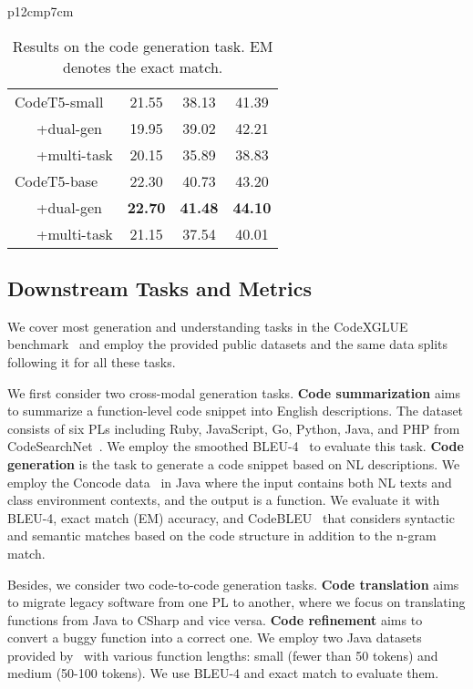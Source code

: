 \documentclass[11pt]{article}
\begin{document}
\begin{table*} [t]
\begin{center}
{\begin{tabular}{p{12cm}p{7cm}}
\begin{minipage}{0.48\textwidth}
{\begin{tabular}{lc c c}
CodeT5-small &21.55	&38.13	&41.39 \\
~~~+dual-gen	&19.95	&39.02	&42.21 \\
~~~+multi-task	& 20.15 &35.89 &38.83 \\
\cdashline{1-4}

CodeT5-base &22.30 &40.73 &43.20 \\
~~~+dual-gen	& \textbf{22.70} &	\textbf{41.48}&	\textbf{44.10}\\
~~~+multi-task	& 21.15 & 37.54 & 40.01 \\

\bottomrule
\end{tabular}
}
\captionsetup{type=table}
\vspace{-0.5em}  
\caption{Results on the code generation task.
EM denotes the exact match.
}
\label{table:concode}

\end{minipage}
\end{tabular}
}
\end{center}
\vspace{-2em}
\end{table*}

 
\subsection{Downstream Tasks and  Metrics}
We cover most generation and understanding tasks in the CodeXGLUE benchmark~\cite{DBLP:journals/corr/abs-2102-04664} and employ the provided public datasets and the same data splits following it for all these tasks. 

We first consider two cross-modal generation tasks. \textbf{Code summarization} aims to summarize a function-level code snippet into English descriptions. The dataset consists of six PLs including Ruby, JavaScript, Go, Python, Java, and PHP from CodeSearchNet~\cite{DBLP:journals/corr/abs-1909-09436}.  We employ the smoothed BLEU-4~\cite{DBLP:conf/coling/LinO04} to evaluate  this task.
\textbf{Code generation} is the task to generate a code snippet based on NL descriptions.  We employ the Concode data~\cite{DBLP:conf/emnlp/IyerKCZ18} in Java where the input contains both NL texts and class environment contexts, and the output is a function. We evaluate it with BLEU-4, exact match (EM) accuracy, and CodeBLEU~\cite{DBLP:journals/corr/abs-2009-10297} that considers  syntactic and semantic matches based on the code structure in addition to the n-gram match.

Besides, we consider two code-to-code generation tasks. \textbf{Code translation} aims to migrate legacy software from one PL to another, where we focus on translating functions from Java to CSharp and vice versa. \textbf{Code refinement} aims to convert a buggy function into a correct one. We employ two Java datasets provided by~\citet{DBLP:journals/tosem/TufanoWBPWP19} with various function lengths: small (fewer than 50 tokens) and medium (50-100 tokens). 
We use BLEU-4 and exact match to evaluate them.
\end{document}
